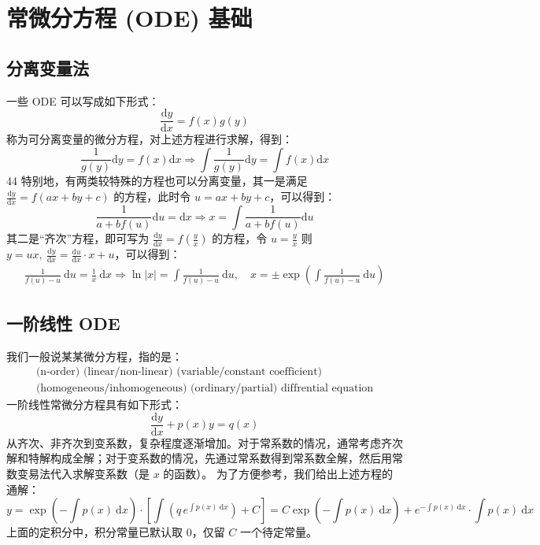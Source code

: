 \documentclass[UTF8]{report}
\theoremstyle{MyLineTheoremStyle} %
\theoremstyle{MyBlockTheoremStyle} %
\theoremstyle{MySubsubsectionStyle} %
\begin{document}
\chapter{常微分方程 (ODE) 基础}\thispagestyle{fancy}

\section{分离变量法}
一些 ODE 可以写成如下形式：
\begin{equation}
    \frac{\mathrm{d} y }{\mathrm{d} x } = f(x) g(y)
\end{equation}
称为可分离变量的微分方程，对上述方程进行求解，得到：
\begin{equation}
\frac{1}{g(y)} \mathrm{d}y = f(x) \mathrm{d}x \Longrightarrow 
\int \frac{1}{g(y)} \mathrm{d}y = \int f(x) \mathrm{d}x
\end{equation}44
特别地，有两类较特殊的方程也可以分离变量，其一是满足 $\frac{\mathrm{d} y }{\mathrm{d} x } = f(ax + by + c)$ 的方程，此时令 $u = ax + by + c$，可以得到：
\begin{equation}
\frac{1}{a + b f(u)}\mathrm{d}u = \mathrm{d}x
\Longrightarrow x = \int \frac{1}{a + b f(u)}\mathrm{d}u 
\end{equation}
其二是“齐次”方程，即可写为 $\frac{\mathrm{d} y }{\mathrm{d} x } = f\left( \frac{y}{x} \right)$ 的方程，令 $u = \frac{y}{x}$ 则 $y = ux,\ \frac{\mathrm{d} y }{\mathrm{d} x } = \frac{\mathrm{d} u }{\mathrm{d} x }\cdot x + u$，可以得到：
\begin{gather}
\frac{1}{f(u) - u}\ \mathrm{d}u = \frac{1}{x}\ \mathrm{d}x
\Longrightarrow \ln |x| = \int \frac{1}{f(u) - u}\ \mathrm{d}u,\quad 
x = \pm \exp \left(\int \frac{1}{f(u) - u}\ \mathrm{d}u\right)
\end{gather}

\section{一阶线性 ODE}
我们一般说某某微分方程，指的是：
\begin{gather}
\text{(n-order)\ \  (linear/non-linear)\ \ (variable/constant coefficient)} \\ 
\text{
    (homogeneous/inhomogeneous) \ \ (ordinary/partial)\ \  diffrential equation}
\end{gather}
一阶线性常微分方程具有如下形式：
\begin{equation}
    \frac{\mathrm{d} y }{\mathrm{d} x } + p(x) y = q(x)
\end{equation}
从齐次、非齐次到变系数，复杂程度逐渐增加。对于常系数的情况，通常考虑齐次解和特解构成全解；对于变系数的情况，先通过常系数得到常系数全解，然后用常数变易法代入求解变系数（是 $x$ 的函数）。
为了方便参考，我们给出上述方程的通解：
\begin{equation}
y = \exp \left(-\int p(x) \ \mathrm{d}x\right)\cdot \left[ \int \left(q \,e^{\int p(x) \ \mathrm{d}x}\right) + C \right] = C \exp \left(-\int p(x) \ \mathrm{d}x\right) + e^{-\int p(x) \ \mathrm{d}x} \cdot \int p(x) \ \mathrm{d}x
\end{equation}
上面的定积分中，积分常量已默认取 $0$，仅留 $C$ 一个待定常量。
\end{document}
